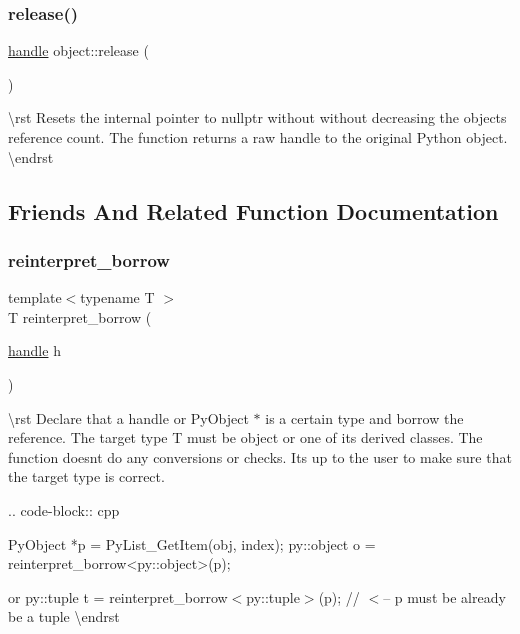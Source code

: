 \mbox{\label{classobject_a4ce66b1d44b37ae6b28e80228b075aae}} 
\subsubsection{\texorpdfstring{release()}{release()}}
{\footnotesize\ttfamily \mbox{\hyperlink{classhandle}{handle}} object\+::release (\begin{DoxyParamCaption}{ }\end{DoxyParamCaption})\hspace{0.3cm}{\ttfamily [inline]}}

\textbackslash{}rst Resets the internal pointer to {\ttfamily nullptr} without without decreasing the object\textquotesingle{}s reference count. The function returns a raw handle to the original Python object. \textbackslash{}endrst 

\subsection{Friends And Related Function Documentation}
\mbox{\label{classobject_ac1ea1a4cbcf197d7c8096037633720d7}} 
\subsubsection{\texorpdfstring{reinterpret\_borrow}{reinterpret\_borrow}}
{\footnotesize\ttfamily template$<$typename T $>$ \\
T reinterpret\+\_\+borrow (\begin{DoxyParamCaption}\item[{\mbox{\hyperlink{classhandle}{handle}}}]{h }\end{DoxyParamCaption})\hspace{0.3cm}{\ttfamily [friend]}}

\textbackslash{}rst Declare that a {\ttfamily handle} or {\ttfamily Py\+Object $\ast$} is a certain type and borrow the reference. The target type {\ttfamily T} must be {\ttfamily object} or one of its derived classes. The function doesn\textquotesingle{}t do any conversions or checks. It\textquotesingle{}s up to the user to make sure that the target type is correct.

.. code-\/block\+:: cpp \begin{DoxyVerb}PyObject *p = PyList_GetItem(obj, index);
py::object o = reinterpret_borrow<py::object>(p);
\end{DoxyVerb}
 or py\+::tuple t = reinterpret\+\_\+borrow$<$py\+::tuple$>$(p); // $<$-- {\ttfamily p} must be already be a {\ttfamily tuple} \textbackslash{}endrst \mbox{\label{classobject_ae1de2ab5a755c10582ac1e46071de5c5}} 
